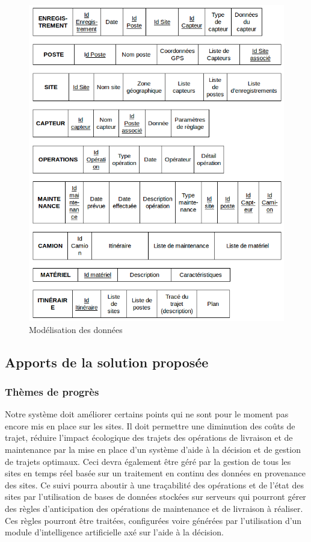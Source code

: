 \documentclass{mise_en_page}
\begin{document}
\begin{figure}[H]
	\centering
	\includegraphics[width=150mm]{tables.png}
	\caption{Modélisation des données}
\end{figure}

\subsection{Apports de la solution proposée}

\subsubsection{Thèmes de progrès}

Notre système doit améliorer certains points qui ne sont pour le moment pas encore mis en place sur les sites. Il doit permettre une diminution des coûts de trajet, réduire l’impact écologique des trajets des opérations de livraison et de maintenance par la mise en place d’un système d’aide à la décision et de gestion de trajets optimaux. Ceci devra également être géré par la gestion de tous les sites en temps réel basée sur un traitement en continu des données en provenance des sites. Ce suivi pourra aboutir à une traçabilité des opérations et de l’état des sites par l’utilisation de bases de données stockées sur serveurs qui pourront gérer des règles d’anticipation des opérations de maintenance et de livraison à réaliser. Ces règles pourront être traitées, configurées voire générées par l’utilisation d’un module d’intelligence artificielle axé sur l’aide à la décision.
\end{document}
